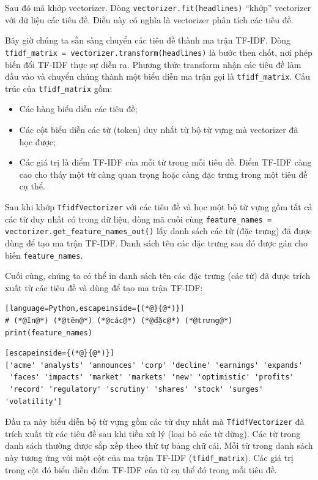 Sau đó mã khớp vectorizer. Dòng \texttt{vectorizer.fit(headlines)} ``khớp'' vectorizer với dữ liệu các tiêu đề. Điều này có nghĩa là vectorizer phân tích các tiêu đề.

Bây giờ chúng ta sẵn sàng chuyển các tiêu đề thành ma trận TF-IDF. Dòng \texttt{tfidf\_matrix = vectorizer.transform(headlines)} là bước then chốt, nơi phép biến đổi TF-IDF thực sự diễn ra. Phương thức transform nhận các tiêu đề làm đầu vào và chuyển chúng thành một biểu diễn ma trận gọi là \texttt{tfidf\_matrix}. Cấu trúc của \texttt{tfidf\_matrix} gồm:

\begin{itemize}
  \item Các hàng biểu diễn các tiêu đề;
  \item Các cột biểu diễn các từ (token) duy nhất từ bộ từ vựng mà vectorizer đã học được;
  \item Các giá trị là điểm TF-IDF của mỗi từ trong mỗi tiêu đề. Điểm TF-IDF càng cao cho thấy một từ càng quan trọng hoặc càng đặc trưng trong một tiêu đề cụ thể.
\end{itemize}

Sau khi khớp \texttt{TfidfVectorizer} với các tiêu đề và học một bộ từ vựng gồm tất cả các từ duy nhất có trong dữ liệu, dòng mã cuối cùng \texttt{feature\_names = vectorizer.get\_feature\_names\_out()} lấy danh sách các từ (đặc trưng) đã được dùng để tạo ma trận TF-IDF. Danh sách tên các đặc trưng sau đó được gán cho biến \texttt{feature\_names}.

Cuối cùng, chúng ta có thể in danh sách tên các đặc trưng (các từ) đã được trích xuất từ các tiêu đề và dùng để tạo ma trận TF-IDF:

\begin{lstlisting}[language=Python,escapeinside={(*@}{@*)}]
# (*@In@*) (*@tên@*) (*@các@*) (*@đặc@*) (*@trưng@*)
print(feature_names)
\end{lstlisting}

\begin{lstlisting}[escapeinside={(*@}{@*)}]
['acme' 'analysts' 'announces' 'corp' 'decline' 'earnings' 'expands'
 'faces' 'impacts' 'market' 'markets' 'new' 'optimistic' 'profits'
 'record' 'regulatory' 'scrutiny' 'shares' 'stock' 'surges' 'volatility']
\end{lstlisting}

Đầu ra này biểu diễn bộ từ vựng gồm các từ duy nhất mà \texttt{TfidfVectorizer} đã trích xuất từ các tiêu đề sau khi tiền xử lý (loại bỏ các từ dừng). Các từ trong danh sách thường được sắp xếp theo thứ tự bảng chữ cái. Mỗi từ trong danh sách này tương ứng với một cột của ma trận TF-IDF (\texttt{tfidf\_matrix}). Các giá trị trong cột đó biểu diễn điểm TF-IDF của từ cụ thể đó trong mỗi tiêu đề.

